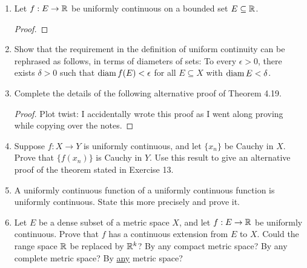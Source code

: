\begin{enumerate}
\begin{proof}
    Notice that $\frac{ab}{a^2 + b^2} \le \frac{1}{2}$ since $(a - b)^2 = a^2 - 2ab + b^2 \ge 0$ for any $a, b$. Thus $f$ is bounded. Now, we have $g(1/n^3, 1/n) = n/2$ so $g$ is unbounded in any neighbourhood of $(0, 0)$. Finally, $f(1/n^2, 1/n) = 1/2$ for any $n$, so $f$ is discontinuous at $(0, 0)$. 

    However, if $x = cy$, $f(cy, y) = \frac{cy^3}{c^2y^2 + y^4} = \frac{cy}{c^2 + y^2} \to 0$ as $y \to 0$, so $f$ is continuous on the line $x = cy$. On any other line not passing through $(0, 0)$, the restriction is purely within the domain of the continuous definition. Similarly, $g(cy, y) = \frac{cy}{c^2 + y^4} \to 0$ as $y \to 0$, so $g$ is continuous on any straight line.
\end{proof}

\item %
Let $f: E \rightarrow \mathbb{R}$ be uniformly continuous on a bounded set $E \subseteq \mathbb{R}$. 
\begin{proof}
    

\end{proof}

\item %
Show that the requirement in the definition of uniform continuity can be rephrased as follows, in terms of diameters of sets: To every $\epsilon > 0$, there exists $\delta > 0$ such that $\operatorname{diam} f(E) < \epsilon$ for all $E \subseteq X$ with $\operatorname{diam} E < \delta$.

\item %
Complete the details of the following alternative proof of Theorem 4.19.
\begin{proof}
Plot twist: I accidentally wrote this proof as I went along proving while copying over the notes.
\end{proof}

\item %
Suppose $f: X \to Y$ is uniformly continuous, and let $\{x_n\}$ be Cauchy in $X$. Prove that $\{f(x_n)\}$ is Cauchy in $Y$. Use this result to give an alternative proof of the theorem stated in Exercise 13.

\item %
A uniformly continuous function of a uniformly continuous function is uniformly continuous. State this more precisely and prove it.

\item %
Let $E$ be a dense subset of a metric space $X$, and let $f: E \rightarrow \mathbb{R}$ be uniformly continuous. Prove that $f$ has a continuous extension from $E$ to $X$. Could the range space $\mathbb{R}$ be replaced by $\mathbb{R}^k$? By any compact metric space? By any complete metric space? By \underline{any} metric space?


\end{enumerate}
